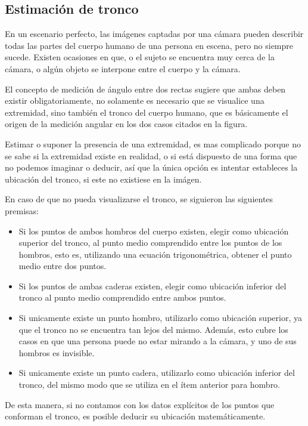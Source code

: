 \documentclass[a4paper,12pt,oneside,spanish]{book}
\begin{document}
\subsection{Estimación de tronco}
En un escenario perfecto, las imágenes captadas por una cámara pueden describir todas las partes del cuerpo humano de una persona en escena, pero no siempre sucede. Existen ocasiones en que, o el sujeto se encuentra muy cerca de la cámara, o algún objeto se interpone entre el cuerpo y la cámara.\par

El concepto de medición de ángulo entre dos rectas sugiere que ambas deben existir  obligatoriamente, no solamente es necesario que se visualice una extremidad, sino también el tronco del cuerpo humano, que es básicamente el origen de la medición angular en los dos casos citados en la figura. \par

Estimar o suponer la presencia de una extremidad, es mas complicado porque no se sabe si la extremidad existe en realidad, o si está dispuesto de una forma que no podemos imaginar o deducir, así que la única opción es intentar estableces la ubicación del tronco, si este no existiese en la imágen.\par

En caso de que no pueda visualizarse el tronco, se siguieron las siguientes premisas:
\begin{itemize}
	\item Si los puntos de ambos hombros del cuerpo existen, elegir como ubicación superior del tronco, al punto medio comprendido entre los puntos de los hombros, esto es, utilizando una ecuación trigonométrica, obtener el punto medio entre dos puntos.
	\item Si los puntos de ambas caderas existen, elegir como ubicación inferior del tronco al punto medio comprendido entre ambos puntos.
	\item Si unicamente existe un punto hombro, utilizarlo como ubicación superior, ya que el tronco no se encuentra tan lejos del mismo. Además, esto cubre los casos en que una persona puede no estar mirando a la cámara, y uno de sus hombros es invisible.
	\item Si unicamente existe un punto cadera, utilizarlo como ubicación inferior del tronco, del mismo modo que se utiliza en el ítem anterior para hombro. 
\end{itemize}
	
De esta manera, si no contamos con los datos explícitos de los puntos que conforman el tronco, es posible deducir su ubicación matemáticamente.\par
\end{document}
